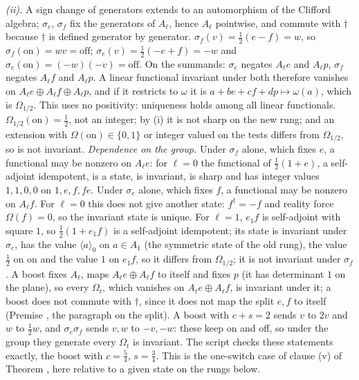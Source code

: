 \emph{(ii).} A sign change of generators extends to an automorphism of the Clifford algebra; $\sigma_{e}$, $\sigma_{f}$ fix the generators of $A_{\ell}$, hence $A_{\ell}$ pointwise, and commute with $\dagger$ because $\dagger$ is defined generator by generator. $\sigma_{f}(v) = \tfrac12(e - f) = w$, so $\sigma_{f}(\mathrm{on}) = wv = \mathrm{off}$; $\sigma_{e}(v) = \tfrac12(-e + f) = -w$ and $\sigma_{e}(\mathrm{on}) = (-w)(-v) = \mathrm{off}$. On the summands: $\sigma_{e}$ negates $A_{\ell}e$ and $A_{\ell}p$, $\sigma_{f}$ negates $A_{\ell}f$ and $A_{\ell}p$. A linear functional invariant under both therefore vanishes on $A_{\ell}e \oplus A_{\ell}f \oplus A_{\ell}p$, and if it restricts to $\omega$ it is $a + be + cf + dp \mapsto \omega(a)$, which is $\Omega_{1/2}$. This uses no positivity: uniqueness holds among all linear functionals. $\Omega_{1/2}(\mathrm{on}) = \tfrac12$, not an integer; by (i) it is not sharp on the new rung; and an extension with $\Omega(\mathrm{on}) \in \{0, 1\}$ or integer valued on the tests differs from $\Omega_{1/2}$, so is not invariant. \emph{Dependence on the group.} Under $\sigma_{f}$ alone, which fixes $e$, a functional may be nonzero on $A_{\ell}e$: for $\ell = 0$ the functional of $\tfrac12(1 + e)$, a self-adjoint idempotent, is a state, is invariant, is sharp and has integer values $1, 1, 0, 0$ on $1, e, f, fe$. Under $\sigma_{e}$ alone, which fixes $f$, a functional may be nonzero on $A_{\ell}f$. For $\ell = 0$ this does not give another state: $f^{\dagger} = -f$ and reality force $\Omega(f) = 0$, so the invariant state is unique. For $\ell = 1$, $e_{1}f$ is self-adjoint with square $1$, so $\tfrac12(1 + e_{1}f)$ is a self-adjoint idempotent; its state is invariant under $\sigma_{e}$, has the value $\langle a\rangle_{0}$ on $a \in A_{1}$ (the symmetric state of the old rung), the value $\tfrac12$ on $\mathrm{on}$ and the value $1$ on $e_{1}f$, so it differs from $\Omega_{1/2}$; it is not invariant under $\sigma_{f}$. A boost fixes $A_{\ell}$, maps $A_{\ell}e \oplus A_{\ell}f$ to itself and fixes $p$ (it has determinant $1$ on the plane), so every $\Omega_{t}$, which vanishes on $A_{\ell}e \oplus A_{\ell}f$, is invariant under it; a boost does not commute with $\dagger$, since it does not map the split $e, f$ to itself (Premise , the paragraph on the split). A boost with $c + s = 2$ sends $v$ to $2v$ and $w$ to $\tfrac12 w$, and $\sigma_{e}\sigma_{f}$ sends $v, w$ to $-v, -w$: these keep on and off, so under the group they generate every $\Omega_{t}$ is invariant. The script checks these statements exactly, the boost with $c = \tfrac54$, $s = \tfrac34$. This is the one-switch case of clause (v) of Theorem , here relative to a given state on the rungs below.

